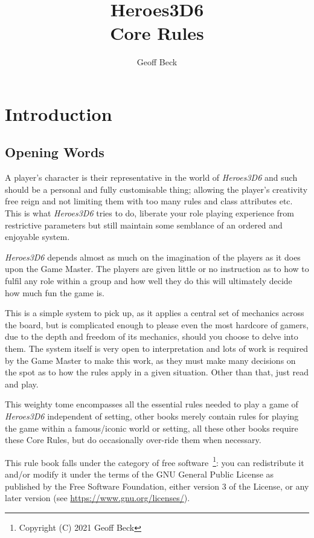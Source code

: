 \documentclass[a4paper,10pt,oneside]{book}
\title{\textbf{\huge Heroes3D6\\Core Rules}}
\author{Geoff Beck}
\date{}
\begin{document}
\maketitle
\frontmatter
\tableofcontents
\mainmatter

\chapter{Introduction}

\section{Opening Words}
A player's character is their representative in the world of \textit{Heroes3D6} and such should be a personal and fully customisable thing; allowing the player's creativity free reign and not limiting them with too many rules and class attributes etc. This is what \textit{Heroes3D6} tries to do, liberate your role playing experience from restrictive parameters but still maintain some semblance of an ordered and enjoyable system.

\textit{Heroes3D6} depends almost as much on the imagination of the players as it does upon the Game Master. The players are given little or no instruction as to how to fulfil any role within a group and how well they do this will ultimately decide how much fun the game is.

This is a simple system to pick up, as it applies a central set of mechanics across the board, but is complicated enough to please even the most hardcore of gamers, due to the depth and freedom of its mechanics, should you choose to delve into them. The system itself is very open to interpretation and lots of work is required by the Game Master to make this work, as they must make many decisions on the spot as to how the rules apply in a given situation. Other than that, just read and play.

This weighty tome encompasses all the essential rules needed to play a game of \textit{Heroes3D6} independent of setting, other books merely contain rules for playing the game within a famous/iconic world or setting, all these other books require these Core Rules, but do occasionally over-ride them when necessary.

This rule book falls under the category of free software~\footnote{Copyright (C) 2021  Geoff Beck}: you can redistribute it and/or modify
it under the terms of the GNU General Public License as published by
the Free Software Foundation, either version 3 of the License, or any later version (see \url{https://www.gnu.org/licenses/}).
\end{document}
